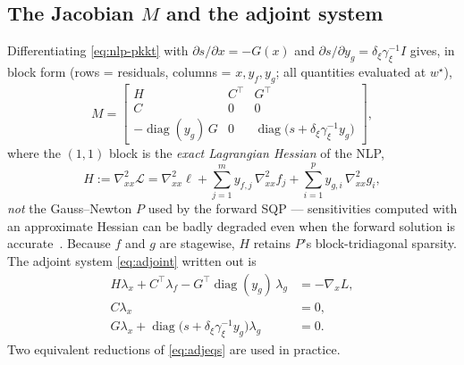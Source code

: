 \documentclass[10pt,twocolumn]{article}
\newcommand{\diag}{\operatorname{diag}}
\begin{document}
\subsection{The Jacobian $M$ and the adjoint system}
Differentiating \eqref{eq:nlp-pkkt} with $\partial s/\partial x = -G(x)$ and
$\partial s/\partial y_g = \delta_\xi\gamma_\xi^{-1}I$ gives, in block form (rows =
residuals, columns = $x, y_f, y_g$; all quantities evaluated at $w^\star$),
\begin{equation}
\label{eq:M}
M =
\begin{bmatrix}
H & C^\top & G^\top\\
C & 0 & 0\\
-\diag(y_g)\,G & 0 & \diag\!\bigl(s + \delta_\xi\gamma_\xi^{-1}y_g\bigr)
\end{bmatrix},
\end{equation}
where the $(1,1)$ block is the \emph{exact Lagrangian Hessian} of the NLP,
\begin{equation}
\label{eq:H}
H := \nabla^2_{xx}\mathcal L
= \nabla^2_{xx}\ell
+ \sum_{j=1}^{m} y_{f,j}\,\nabla^2_{xx} f_j
+ \sum_{i=1}^{p} y_{g,i}\,\nabla^2_{xx} g_i ,
\end{equation}
\emph{not} the Gauss--Newton $P$ used by the forward SQP --- sensitivities computed
with an approximate Hessian can be badly degraded even when the forward solution is
accurate~\cite[Thm.~2, Rem.~3]{frey}. Because $f$ and $g$ are stagewise, $H$ retains
$P$'s block-tridiagonal sparsity. The adjoint system \eqref{eq:adjoint} written out
is
\begin{subequations}
\label{eq:adjeqs}
\begin{align}
H\lambda_x + C^\top\lambda_f - G^\top\diag(y_g)\,\lambda_g &= -\nabla_x L,
\label{eq:adj-a}\\
C\lambda_x &= 0, \label{eq:adj-b}\\
G\lambda_x + \diag\!\bigl(s+\delta_\xi\gamma_\xi^{-1}y_g\bigr)\lambda_g &= 0.
\label{eq:adj-c}
\end{align}
\end{subequations}
Two equivalent reductions of \eqref{eq:adjeqs} are used in practice.
\end{document}
